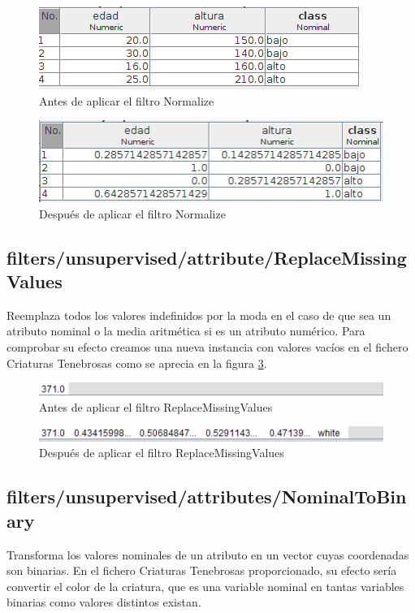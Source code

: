 \documentclass[11pt,twoside,a4paper]{book}
\begin{document}
\begin{figure}[H]
   \includegraphics[width=\textwidth]{ejercicio5_1.png}
	\caption{Antes de aplicar el filtro Normalize}
	\label{Fig11}
\end{figure}
\begin{figure}[H]
   \includegraphics[width=\textwidth]{ejercicio5_2.png}
	\caption{Después de aplicar el filtro Normalize}
	\label{Fig12}
\end{figure}

\subsection{filters/unsupervised/attribute/ReplaceMissingValues}
Reemplaza todos los valores indefinidos por la moda en el caso de que
sea un atributo nominal o la media aritmética si es un atributo numérico. Para comprobar su efecto creamos una nueva instancia con valores vacíos en el fichero Criaturas Tenebrosas como se aprecia en la figura \ref{Fig13}.

\begin{figure}[H]
   \includegraphics[width=\textwidth]{ReplaceMissingValues1.png}
	\caption{Antes de aplicar el filtro ReplaceMissingValues}
	\label{Fig13}
\end{figure}
\begin{figure}[H]
   \includegraphics[width=\textwidth]{ReplaceMissingValues2.png}
	\caption{Después de aplicar el filtro ReplaceMissingValues}
	\label{Fig14}
\end{figure}

\subsection{filters/unsupervised/attributes/NominalToBinary}
Transforma los valores nominales de un atributo en un vector cuyas coordenadas son binarias. En el fichero Criaturas Tenebrosas proporcionado, su efecto sería convertir el color de la criatura, que es una variable nominal en tantas variables binarias como valores distintos existan.
\end{document}
